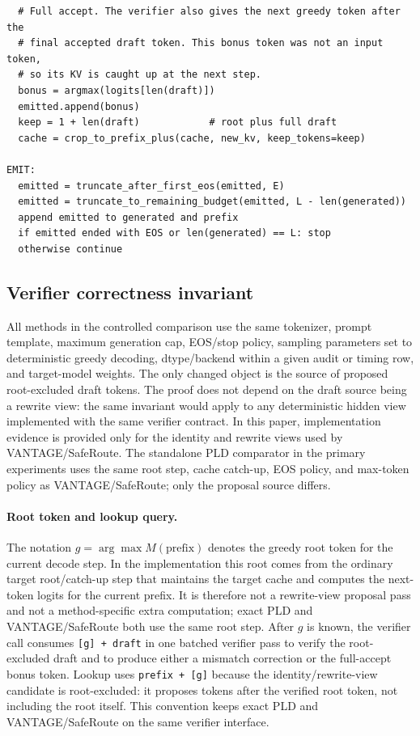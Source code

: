 \documentclass[11pt,a4paper]{article}
\begin{document}
\begin{lstlisting}
  # Full accept. The verifier also gives the next greedy token after the
  # final accepted draft token. This bonus token was not an input token,
  # so its KV is caught up at the next step.
  bonus = argmax(logits[len(draft)])
  emitted.append(bonus)
  keep = 1 + len(draft)            # root plus full draft
  cache = crop_to_prefix_plus(cache, new_kv, keep_tokens=keep)

EMIT:
  emitted = truncate_after_first_eos(emitted, E)
  emitted = truncate_to_remaining_budget(emitted, L - len(generated))
  append emitted to generated and prefix
  if emitted ended with EOS or len(generated) == L: stop
  otherwise continue
\end{lstlisting}

\subsection{Verifier correctness invariant}
\label{sec:correctness}

All methods in the controlled comparison use the same tokenizer, prompt
template, maximum generation cap, EOS/stop policy, sampling parameters
set to deterministic greedy decoding, dtype/backend within a given audit
or timing row, and target-model weights. The only changed object is the
source of proposed root-excluded draft tokens. The proof does not depend on
the draft source being a rewrite view: the same invariant would apply to any
deterministic hidden view implemented with the same verifier contract. In this
paper, implementation evidence is provided only for the identity and rewrite
views used by VANTAGE/SafeRoute.
The standalone PLD comparator in the primary experiments uses the same root
step, cache catch-up, EOS policy, and max-token policy as VANTAGE/SafeRoute;
only the proposal source differs.

\paragraph{Root token and lookup query.}
The notation $g=\arg\max M(\mathrm{prefix})$ denotes the greedy root
token for the current decode step. In the implementation this root
comes from the ordinary target root/catch-up step that maintains the
target cache and computes the next-token logits for the current prefix.
It is therefore not a rewrite-view proposal pass and not a method-specific
extra computation; exact PLD and VANTAGE/SafeRoute both use the same root step.
After $g$ is known, the verifier call consumes \texttt{[g] + draft} in
one batched verifier pass to verify the root-excluded draft and to
produce either a mismatch correction or the full-accept bonus token.
Lookup uses \texttt{prefix + [g]} because the identity/rewrite-view candidate
is root-excluded: it proposes tokens after the verified root token, not
including the root itself. This convention keeps exact PLD and VANTAGE/SafeRoute
on the same verifier interface.
\end{document}
